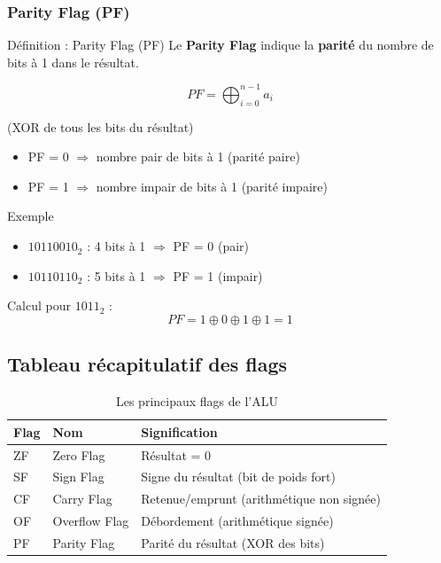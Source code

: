 \documentclass[a4paper,12pt]{article}
\begin{document}
\subsubsection{Parity Flag (PF)}

\begin{defbox}{Définition : Parity Flag (PF)}
Le \textbf{Parity Flag} indique la \textbf{parité} du nombre de bits à 1 dans le résultat.

\[PF = \bigoplus_{i=0}^{n-1} a_i\]

(XOR de tous les bits du résultat)

\begin{itemize}
    \item PF = 0 $\Rightarrow$ nombre pair de bits à 1 (parité paire)
    \item PF = 1 $\Rightarrow$ nombre impair de bits à 1 (parité impaire)
\end{itemize}
\end{defbox}

\begin{examplebox}{Exemple}
\begin{itemize}
    \item $10110010_2$ : 4 bits à 1 $\Rightarrow$ PF = 0 (pair)
    \item $10110110_2$ : 5 bits à 1 $\Rightarrow$ PF = 1 (impair)
\end{itemize}

Calcul pour $1011_2$ :
\[PF = 1 \oplus 0 \oplus 1 \oplus 1 = 1\]
\end{examplebox}

\subsection{Tableau récapitulatif des flags}

\begin{table}[h]
\centering
\begin{tabular}{|l|l|p{7cm}|}
\hline
\textbf{Flag} & \textbf{Nom} & \textbf{Signification} \\
\hline
ZF & Zero Flag & Résultat = 0 \\
\hline
SF & Sign Flag & Signe du résultat (bit de poids fort) \\
\hline
CF & Carry Flag & Retenue/emprunt (arithmétique non signée) \\
\hline
OF & Overflow Flag & Débordement (arithmétique signée) \\
\hline
PF & Parity Flag & Parité du résultat (XOR des bits) \\
\hline
\end{tabular}
\caption{Les principaux flags de l'ALU}
\end{table}
\end{document}
